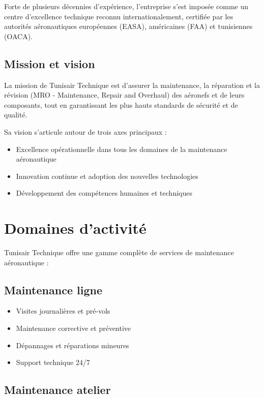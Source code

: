 \documentclass[12pt,a4paper]{report}
\begin{document}
Forte de plusieurs décennies d'expérience, l'entreprise s'est imposée comme un centre d'excellence technique reconnu internationalement, certifiée par les autorités aéronautiques européennes (EASA), américaines (FAA) et tunisiennes (OACA).

\subsection{Mission et vision}

La mission de Tunisair Technique est d'assurer la maintenance, la réparation et la révision (MRO - Maintenance, Repair and Overhaul) des aéronefs et de leurs composants, tout en garantissant les plus hauts standards de sécurité et de qualité.

Sa vision s'articule autour de trois axes principaux :
\begin{itemize}
    \item Excellence opérationnelle dans tous les domaines de la maintenance aéronautique
    \item Innovation continue et adoption des nouvelles technologies
    \item Développement des compétences humaines et techniques
\end{itemize}

\section{Domaines d'activité}

Tunisair Technique offre une gamme complète de services de maintenance aéronautique :

\subsection{Maintenance ligne}

\begin{itemize}
    \item Visites journalières et pré-vols
    \item Maintenance corrective et préventive
    \item Dépannages et réparations mineures
    \item Support technique 24/7
\end{itemize}

\subsection{Maintenance atelier}
\end{document}
